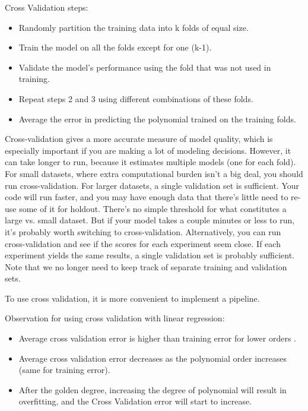 \documentclass[12pt]{report}
\begin{document}
Cross Validation steps:

\begin{itemize}
  \item Randomly partition the training data into k folds of equal size.
  \item Train the model on all the folds except for one (k-1).
  \item Validate the model’s performance using the fold that was not used in training.
  \item Repeat steps 2 and 3 using different combinations of these folds.
  \item Average the error in predicting the polynomial trained on the training folds.
\end{itemize}

Cross-validation gives a more accurate measure of model quality, which is especially important if you are making a lot of modeling decisions. However, it can take longer to run, because it estimates multiple models (one for each fold). For small datasets, where extra computational burden isn't a big deal, you should run cross-validation. For larger datasets, a single validation set is sufficient. Your code will run faster, and you may have enough data that there's little need to re-use some of it for holdout. There's no simple threshold for what constitutes a large vs. small dataset. But if your model takes a couple minutes or less to run, it's probably worth switching to cross-validation. Alternatively, you can run cross-validation and see if the scores for each experiment seem close. If each experiment yields the same results, a single validation set is probably sufficient. Note that we no longer need to keep track of separate training and validation sets.

To use cross validation, it is more convenient to implement a pipeline.

Observation for using cross validation with linear regression:
\begin{itemize}
  \item Average cross validation error is higher than training error for lower orders .
  \item Average cross validation error decreases as the polynomial order increases (same for training error).
  \item After the golden degree, increasing the degree of polynomial will result in overfitting, and the Cross Validation error will start to increase.
\end{itemize}
\end{document}
